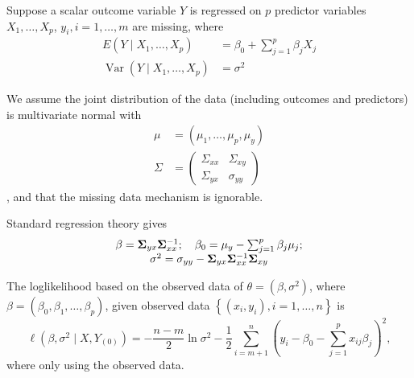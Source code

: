 \begin{example}
	Suppose a scalar outcome variable $Y$ is regressed on $p$ predictor variables $X_{1},\ldots,X_{p}$, $y_{i},i=1,\ldots,m$ are missing, where
	\begin{equation}
		\begin{aligned}
			E\left(Y \mid X_{1}, \ldots, X_{p}\right)                  & =\beta_{0}+\sum_{j=1}^{p} \beta_{j} X_{j} \\
			\operatorname{Var}\left(Y \mid X_{1}, \ldots, X_{p}\right) & =\sigma^{2}
		\end{aligned}
	\end{equation}

	We assume the joint distribution of the data (including outcomes and predictors) is multivariate normal with
	\begin{equation}
		\begin{aligned}
			\mu    & =\left(\mu_{1}, \ldots, \mu_{p}, \mu_{y}\right) \\
			\Sigma & =\left(\begin{array}{ll}
				                \Sigma_{x x} & \Sigma_{x y} \\
				                \Sigma_{y x} & \sigma_{y y}
			                \end{array}\right)
		\end{aligned}
	\end{equation}
	, and that the missing data mechanism is ignorable.

	Standard regression theory gives
	\begin{equation}
		\begin{array}{c}
			\beta=\boldsymbol{\Sigma}_{y x} \boldsymbol{\Sigma}_{x x}^{-1} ; \quad \beta_{0}=\mu_{y}-\sum_{j=1}^{p} \beta_{j} \mu_{j} ; \\
			\sigma^{2}=\sigma_{y y}-\boldsymbol{\Sigma}_{y x} \boldsymbol{\Sigma}_{x x}^{-1} \boldsymbol{\Sigma}_{x y}
		\end{array}
	\end{equation}

	The loglikelihood based on the observed data of $\theta=\left(\beta,\sigma^{2}\right)$, where $\beta=\left(\beta_{0},\beta_{1},\ldots,\beta_{p}\right)$, given observed data $\left\{\left(x_{i},y_{i}\right),i=1,\ldots,n\right\}$ is
	\begin{equation}
		\ell(\beta, \sigma^{2} \mid X, Y_{(0)})=-\frac{n-m}{2}\ln\sigma^2-\frac{1}{2}\sum_{i=m+1}^{n}\left(y_{i}-\beta_{0}-\sum_{j=1}^{p}x_{ij}\beta_{j}\right)^2,
	\end{equation}
	where only using the observed data.


\end{example}
